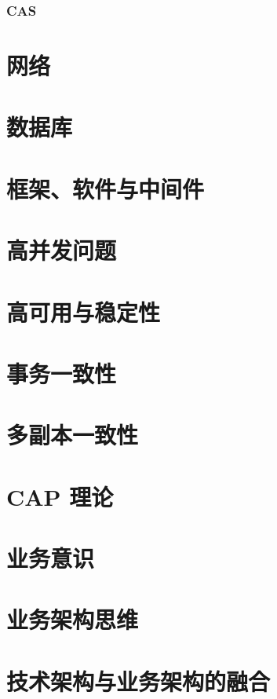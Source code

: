 \documentclass[cn,normal,12pt]{../elegantnote}
\begin{document}
\subsubsection{CAS}

\section{网络}

\section{数据库}

\section{框架、软件与中间件}

\section{高并发问题}

\section{高可用与稳定性}

\section{事务一致性}

\section{多副本一致性}

\section{CAP 理论}

\section{业务意识}

\section{业务架构思维}

\section{技术架构与业务架构的融合}
\end{document}
